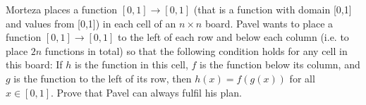 Morteza places a function $[0,1]\to [0,1]$ (that is a function with domain [0,1] and values from [0,1]) in each cell of an $n \times n$ board. Pavel wants to place a function $[0,1]\to [0,1]$ to the left of each row and below each column (i.e. to place $2n$ functions in total) so that the following condition holds for any cell in this board:
If $h$ is the function in this cell, $f$ is the function below its column, and $g$ is the function to the left of its row, then $h(x) = f(g(x))$ for all $x \in [0, 1]$.
Prove that Pavel can always fulfil his plan.